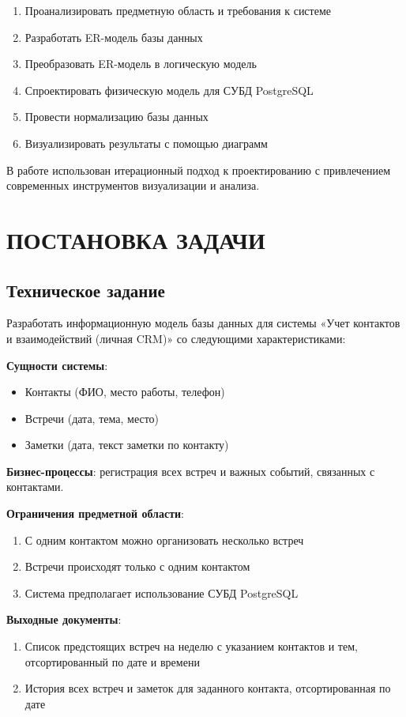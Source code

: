 \documentclass[14pt]{extarticle}
\begin{document}
\begin{enumerate}
    \item Проанализировать предметную область и требования к системе
    \item Разработать ER-модель базы данных
    \item Преобразовать ER-модель в логическую модель
    \item Спроектировать физическую модель для СУБД PostgreSQL
    \item Провести нормализацию базы данных
    \item Визуализировать результаты с помощью диаграмм
\end{enumerate}

В работе использован итерационный подход к проектированию с привлечением современных инструментов визуализации и анализа.

\section{ПОСТАНОВКА ЗАДАЧИ}

\subsection{Техническое задание}

Разработать информационную модель базы данных для системы «Учет контактов и взаимодействий (личная CRM)» со следующими характеристиками:

\textbf{Сущности системы}:
\begin{itemize}
    \item Контакты (ФИО, место работы, телефон)
    \item Встречи (дата, тема, место)
    \item Заметки (дата, текст заметки по контакту)
\end{itemize}

\textbf{Бизнес-процессы}: регистрация всех встреч и важных событий, связанных с контактами.

\textbf{Ограничения предметной области}:
\begin{enumerate}
    \item С одним контактом можно организовать несколько встреч
    \item Встречи происходят только с одним контактом
    \item Система предполагает использование СУБД PostgreSQL
\end{enumerate}

\textbf{Выходные документы}:
\begin{enumerate}
    \item Список предстоящих встреч на неделю с указанием контактов и тем, отсортированный по дате и времени
    \item История всех встреч и заметок для заданного контакта, отсортированная по дате
\end{enumerate}
\end{document}
